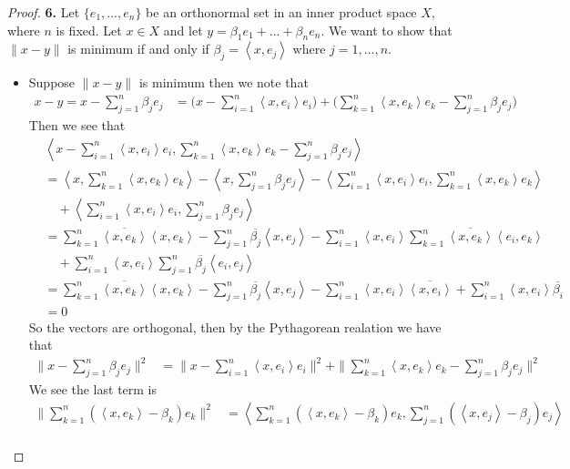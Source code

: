\documentclass[11pt]{article}
\newcommand{\inprd}[1]{\left\langle{#1}\right\rangle}
\theoremstyle{definition}
\begin{document}
\cleardoublepage
\begin{proof}{\textbf{6.}}
Let $\{e_1, ..., e_n\}$ be an orthonormal set in an inner product space $X$,
where $n$ is fixed. Let $x \in X$ and let $y = \beta_1 e_1 +... + \beta_ne_n$.
We want to show that $\|x -y\|$ is minimum if and only if
$\beta_j = \inprd{x,e_j}$ where $j = 1,..., n$.
\begin{itemize}
\item [$(\Rightarrow)$] Suppose $\|x - y\|$ is minimum then we note that
\begin{align*}
    x -y = x - \sum_{j=1}^n \beta_j e_j
    &= \bigg(x - \sum_{i=1}^n \inprd{x, e_i} e_i \bigg)
    + \bigg(\sum_{k=1}^n \inprd{x, e_k} e_k - \sum_{j=1}^n \beta_j e_j\bigg)
\end{align*}
Then we see that
\begin{align*}
    &\inprd{x - \sum_{i=1}^n \inprd{x, e_i} e_i
    , \sum_{k=1}^n \inprd{x, e_k}e_k - \sum_{j=1}^n\beta_j e_j}\\
    &= \inprd{x, \sum_{k=1}^n \inprd{x, e_k}e_k}
    - \inprd{x, \sum_{j=1}^n\beta_j e_j}
    - \inprd{\sum_{i=1}^n \inprd{x, e_i} e_i, \sum_{k=1}^n \inprd{x, e_k}e_k}\\
    &\quad+ \inprd{\sum_{i=1}^n \inprd{x, e_i} e_i,\sum_{j=1}^n\beta_j e_j}\\
    &= \sum_{k=1}^n \overline{\inprd{x, e_k}}\inprd{x, e_k}
    - \sum_{j=1}^n\overline{\beta_j}\inprd{x, e_j}
    - \sum_{i=1}^n\inprd{x, e_i}\sum_{k=1}^n\overline{\inprd{x, e_k}}\inprd{e_i, e_k}\\
    &\quad+ \sum_{i=1}^n\inprd{x, e_i}\sum_{j=1}^n\overline{\beta_j}\inprd{ e_i, e_j}\\
    &= \sum_{k=1}^n \overline{\inprd{x, e_k}}\inprd{x, e_k}
    - \sum_{j=1}^n\overline{\beta_j}\inprd{x, e_j}
    - \sum_{i=1}^n\inprd{x, e_i}\overline{\inprd{x, e_i}}
    + \sum_{i=1}^n\inprd{x, e_i}\overline{\beta_i}\\
    &= 0
\end{align*}
So the vectors are orthogonal, then by the Pythagorean realation we have that
\begin{align*}
    \|x - \sum_{j=1}^n \beta_j e_j\|^2
    &= \|x - \sum_{i=1}^n \inprd{x, e_i} e_i\|^2
    + \|\sum_{k=1}^n \inprd{x, e_k} e_k - \sum_{j=1}^n \beta_j e_j\|^2
\end{align*}
We see the last term is
\begin{align*}
    \|\sum_{k=1}^n (\inprd{x, e_k} - \beta_k)e_k\|^2
    &= \inprd{\sum_{k=1}^n (\inprd{x, e_k} - \beta_k)e_k,
    \sum_{j=1}^n (\inprd{x, e_j} - \beta_j)e_j}\\

\end{align*}
\end{itemize}
\end{proof}
\end{document}
